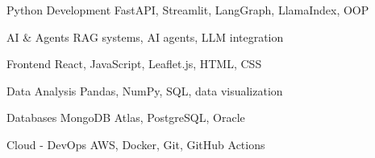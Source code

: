 
\begin{cvskills}

\cvskill
{Python Development}
{FastAPI, Streamlit, LangGraph, LlamaIndex, OOP}

\cvskill
{AI \& Agents}
{RAG systems, AI agents, LLM integration}

\cvskill
{Frontend}
{React, JavaScript, Leaflet.js, HTML, CSS}

\cvskill
{Data Analysis}
{Pandas, NumPy, SQL, data visualization}

\cvskill
{Databases}
{MongoDB Atlas, PostgreSQL, Oracle}

\cvskill
{Cloud - DevOps}
{AWS, Docker, Git, GitHub Actions}

\end{cvskills}

